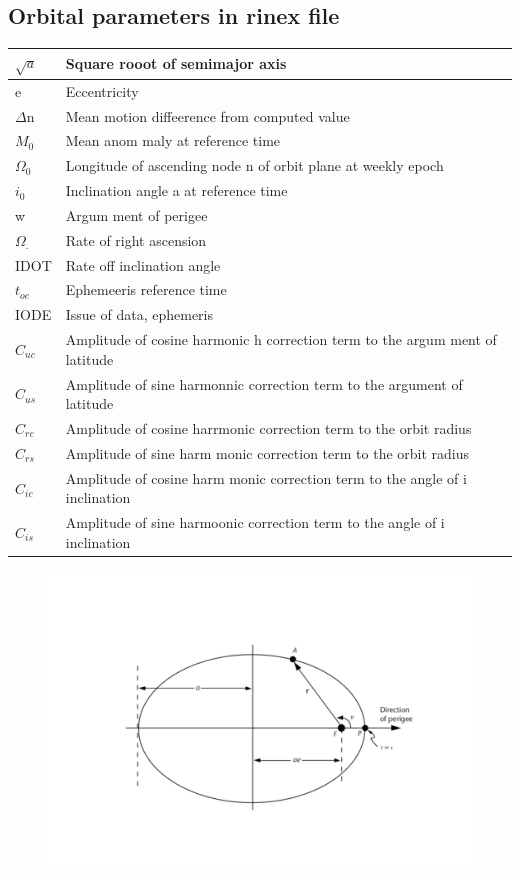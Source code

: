 \documentclass[10pt]{book}
\begin{document}
\subsection{Orbital parameters in rinex file}
\begin{tabular}{ | m{10em} | m{10cm} | } 
  \hline
  $\sqrt{a}$   & Square rooot of semimajor axis \\
  \hline
  e & 
  Eccentricity \\  
  \hline
  $\Delta$n & Mean motion diffeerence from computed value  \\
  \hline
  $M_0$ & Mean anom
  maly at reference time \\
  \hline
  $\Omega_0$ & Longitude of ascending node
  n
  of orbit plane at weekly epoch  \\
  \hline
  $i_0$ & Inclination angle
  a
  at reference time   \\
  \hline
  w & Argum
  ment of perigee \\
  \hline
$\Omega_.$& Rate of right ascension  \\
  \hline
  IDOT & Rate off inclination angle  \\
  \hline
$t_{oe}$  & Ephemeeris reference time  \\
  \hline
  IODE  &  Issue of data, ephemeris \\
  \hline
  $C_{uc}$ & Amplitude of cosine harmonic
  h
  correction term to the
  argum
  ment of latitude   \\
  \hline
  $C_{us}$& Amplitude of sine harmonnic correction term to the argument
  of latitude \\
  \hline
  $C_{rc}$  &  Amplitude of cosine harrmonic correction term to the orbit
  radius \\
  \hline
  $C_{rs}$ & Amplitude of sine harm
  monic correction term to the orbit
  radius  \\
  \hline
  $C_{ic}$ & Amplitude of cosine harm
  monic correction term to the angle of
  i
  inclination \\
  \hline
  $C_{is}$ & Amplitude of sine harmoonic correction term to the angle of
  i
  inclination  \\
  \hline
\end{tabular}
\begin{figure}
\includegraphics[scale=0.4]{./figs/1.pdf}
\end{figure}
\end{document}

